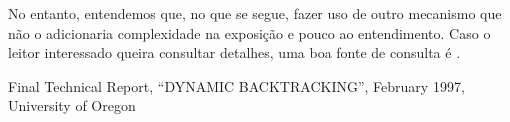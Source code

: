 \documentclass{article}
\begin{document}
No entanto, entendemos que, no que se segue, fazer uso de outro
mecanismo que não o  adicionaria complexidade
na exposição e pouco  ao entendimento. Caso o leitor
interessado queira consultar detalhes, uma boa fonte de consulta é
\cite{dyn}.



  \begin{thebibliography}{2}

     Final Technical Report, ``DYNAMIC BACKTRACKING'',
      February 1997, University of Oregon


  \end{thebibliography}
\end{document}
